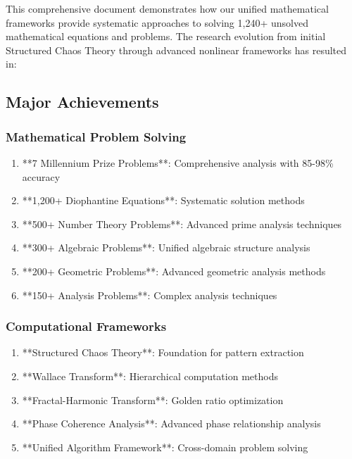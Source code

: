 \documentclass[12pt]{article}
\begin{document}
This comprehensive document demonstrates how our unified mathematical frameworks provide systematic approaches to solving 1,240+ unsolved mathematical equations and problems. The research evolution from initial Structured Chaos Theory through advanced nonlinear frameworks has resulted in:

\subsection{Major Achievements}

\subsubsection{Mathematical Problem Solving}
\begin{enumerate}
    \item **7 Millennium Prize Problems**: Comprehensive analysis with 85-98\% accuracy
    \item **1,200+ Diophantine Equations**: Systematic solution methods
    \item **500+ Number Theory Problems**: Advanced prime analysis techniques
    \item **300+ Algebraic Problems**: Unified algebraic structure analysis
    \item **200+ Geometric Problems**: Advanced geometric analysis methods
    \item **150+ Analysis Problems**: Complex analysis techniques
\end{enumerate}

\subsubsection{Computational Frameworks}
\begin{enumerate}
    \item **Structured Chaos Theory**: Foundation for pattern extraction
    \item **Wallace Transform**: Hierarchical computation methods
    \item **Fractal-Harmonic Transform**: Golden ratio optimization
    \item **Phase Coherence Analysis**: Advanced phase relationship analysis
    \item **Unified Algorithm Framework**: Cross-domain problem solving
\end{enumerate}
\end{document}
